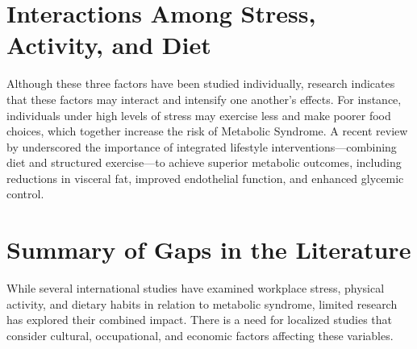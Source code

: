 \section{Interactions Among Stress, Activity, and Diet}

Although these three factors have been studied individually, research indicates that these factors may interact and intensify one another's effects. For instance, individuals under high levels of stress may exercise less and make poorer food choices, which together increase the risk of Metabolic Syndrome. A recent review by \cite{stavitz2025plantbased} underscored the importance of integrated lifestyle interventions—combining diet and structured exercise—to achieve superior metabolic outcomes, including reductions in visceral fat, improved endothelial function, and enhanced glycemic control.


\section{Summary of Gaps in the Literature}

While several international studies have examined workplace stress, physical activity, and dietary habits in relation to metabolic syndrome, limited research has explored their combined impact. There is a need for localized studies that consider cultural, occupational, and economic factors affecting these variables.











